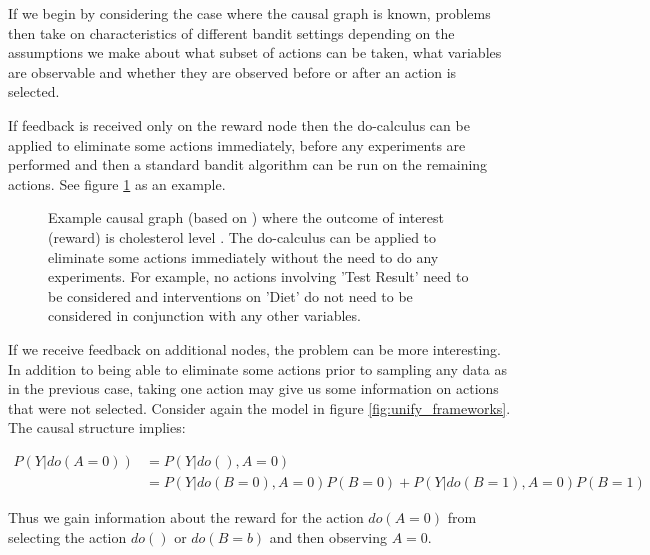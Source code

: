 \documentclass[11pt,a4paper]{article}
\newcommand{\eqn}[1]{\begin{align}#1\end{align}}
\begin{document}
If we begin by considering the case where the causal graph is known, problems then take on characteristics of different bandit settings depending on the assumptions we make about what subset of actions can be taken, what variables are observable and whether they are observed before or after an action is selected. 

If feedback is received only on the reward node then the do-calculus can be applied to eliminate some actions immediately, before any experiments are performed and then a standard bandit algorithm can be run on the remaining actions. See figure \ref{fig:cholesterol_graph} as an example. 

\begin{figure}[h]
\caption{Example causal graph (based on \cite{Koller2009}) where the outcome of interest (reward) is cholesterol level . The do-calculus can be applied to eliminate some actions immediately without the need to do any experiments. For example, no actions involving 'Test Result' need to be considered and interventions on 'Diet' do not need to be considered in conjunction with any other variables.}
\label{fig:cholesterol_graph}
\centering
{}
\end{figure}

If we receive feedback on additional nodes, the problem can be more interesting. In addition to being able to eliminate some actions prior to sampling any data as in the previous case, taking one action may give us some information on actions that were not selected. Consider again the model in figure \ref{fig:unify_frameworks}. The causal structure implies: 

\eqn {
P(Y|do(A = 0)) &= P(Y|do(),A = 0) \\
&= P(Y|do(B=0),A=0)P(B=0)+P(Y|do(B=1),A=0)P(B=1) 
}

Thus we gain information about the reward for the action $do(A=0)$ from selecting the action $do()$ or $do(B = b)$ and then observing $A = 0$.  
\end{document}
